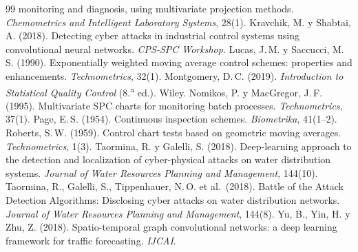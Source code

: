 \documentclass[11pt,a4paper]{article}
\begin{document}
\begin{thebibliography}{99}
  monitoring and diagnosis, using multivariate projection methods.
  \emph{Chemometrics and Intelligent Laboratory Systems}, 28(1).
 Kravchik, M. y Shabtai, A. (2018). Detecting cyber attacks in
  industrial control systems using convolutional neural networks. \emph{CPS-SPC
  Workshop}.
 Lucas, J.\,M. y Saccucci, M.\,S. (1990). Exponentially weighted
  moving average control schemes: properties and enhancements. \emph{Technometrics},
  32(1).
 Montgomery, D.\,C. (2019). \emph{Introduction to Statistical
  Quality Control} (8.\textsuperscript{a} ed.). Wiley.
 Nomikos, P. y MacGregor, J.\,F. (1995). Multivariate SPC charts
  for monitoring batch processes. \emph{Technometrics}, 37(1).
 Page, E.\,S. (1954). Continuous inspection schemes.
  \emph{Biometrika}, 41(1--2).
 Roberts, S.\,W. (1959). Control chart tests based on geometric
  moving averages. \emph{Technometrics}, 1(3).
 Taormina, R. y Galelli, S. (2018). Deep-learning approach to
  the detection and localization of cyber-physical attacks on water distribution
  systems. \emph{Journal of Water Resources Planning and Management}, 144(10).
 Taormina, R., Galelli, S., Tippenhauer, N.\,O. et al.\ (2018).
  Battle of the Attack Detection Algorithms: Disclosing cyber attacks on water
  distribution networks. \emph{Journal of Water Resources Planning and Management},
  144(8).
 Yu, B., Yin, H. y Zhu, Z. (2018). Spatio-temporal graph convolutional
  networks: a deep learning framework for traffic forecasting. \emph{IJCAI}.
\end{thebibliography}
\end{document}
